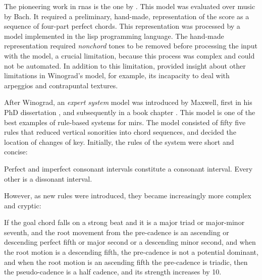 


The pioneering work in \glspl{rna} is the one by
\textcite{winograd1968linguistics}. This model was evaluated
over music by Bach. It required a preliminary, hand-made,
representation of the score as a sequence of four-part
perfect chords. This representation was processed by a model
implemented in the \gls{lisp} programming language. The
hand-made representation required \emph{nonchord} tones to
be removed before processing the input with the model, a
crucial limitation, because this process was complex and
could not be automated. In addition to this limitation,
\textcite{temperley1997algorithm} provided insight about
other limitations in Winograd's model, for example, its
incapacity to deal with arpeggios and contrapuntal textures.

After Winograd, an \emph{expert system} model was introduced
by Maxwell, first in his PhD dissertation
\parencite{maxwell1984artificial}, and subsequently in a
book chapter \parencite{maxwell1992expert}. This model is
one of the best examples of rule-based systems for
\glspl{mir}. The model consisted of fifty five rules that
reduced vertical sonorities into chord sequences, and
decided the location of changes of key. Initially, the rules
of the system were short and concise:

\begin{italicquotes}
    Perfect and imperfect consonant intervals constitute a
    consonant interval. Every other is a dissonant interval.
\end{italicquotes}

However, as new rules were introduced, they became
increasingly more complex and cryptic:

\begin{italicquotes}
    If the goal chord falls on a strong beat and it is a
    major triad or major-minor seventh, and the root
    movement from the pre-cadence is an ascending or
    descending perfect fifth or major second or a descending
    minor second, and when the root motion is a descending
    fifth, the pre-cadence is not a potential dominant, and
    when the root motion is an ascending fifth the
    pre-cadence is triadic, then the pseudo-cadence is a
    half cadence, and its strength increases by 10.
\end{italicquotes}

